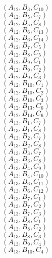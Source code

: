 \documentclass[14pt]{article}
\begin{document}
    $({A}_{12}, {B}_{3}, {C}_{10}) $ \\ 
    $({A}_{12}, {B}_{5}, {C}_{7}) $ \\ 
    $({A}_{12}, {B}_{5}, {C}_{8}) $ \\ 
    $({A}_{12}, {B}_{6}, {C}_{13}) $ \\ 
    $({A}_{12}, {B}_{6}, {C}_{14}) $ \\ 
    $({A}_{12}, {B}_{7}, {C}_{5}) $ \\ 
    $({A}_{12}, {B}_{8}, {C}_{5}) $ \\ 
    $({A}_{12}, {B}_{9}, {C}_{1}) $ \\ 
    $({A}_{12}, {B}_{9}, {C}_{2}) $ \\ 
    $({A}_{12}, {B}_{9}, {C}_{3}) $ \\ 
    $({A}_{12}, {B}_{10}, {C}_{1}) $ \\ 
    $({A}_{12}, {B}_{10}, {C}_{2}) $ \\ 
    $({A}_{12}, {B}_{10}, {C}_{3}) $ \\ 
    $({A}_{12}, {B}_{13}, {C}_{6}) $ \\ 
    $({A}_{12}, {B}_{14}, {C}_{6}) $ \\ 
    $({A}_{13}, {B}_{1}, {C}_{7}) $ \\ 
    $({A}_{13}, {B}_{1}, {C}_{8}) $ \\ 
    $({A}_{13}, {B}_{2}, {C}_{7}) $ \\ 
    $({A}_{13}, {B}_{2}, {C}_{8}) $ \\ 
    $({A}_{13}, {B}_{3}, {C}_{7}) $ \\ 
    $({A}_{13}, {B}_{3}, {C}_{8}) $ \\ 
    $({A}_{13}, {B}_{4}, {C}_{9}) $ \\ 
    $({A}_{13}, {B}_{4}, {C}_{10}) $ \\ 
    $({A}_{13}, {B}_{6}, {C}_{11}) $ \\ 
    $({A}_{13}, {B}_{6}, {C}_{12}) $ \\ 
    $({A}_{13}, {B}_{7}, {C}_{1}) $ \\ 
    $({A}_{13}, {B}_{7}, {C}_{2}) $ \\ 
    $({A}_{13}, {B}_{7}, {C}_{3}) $ \\ 
    $({A}_{13}, {B}_{8}, {C}_{1}) $ \\ 
    $({A}_{13}, {B}_{8}, {C}_{2}) $ \\ 
    $({A}_{13}, {B}_{8}, {C}_{3}) $ \\ 
    $({A}_{13}, {B}_{9}, {C}_{4}) $ \\ 
    $({A}_{13}, {B}_{10}, {C}_{4}) $ \\ 
\end{document}
